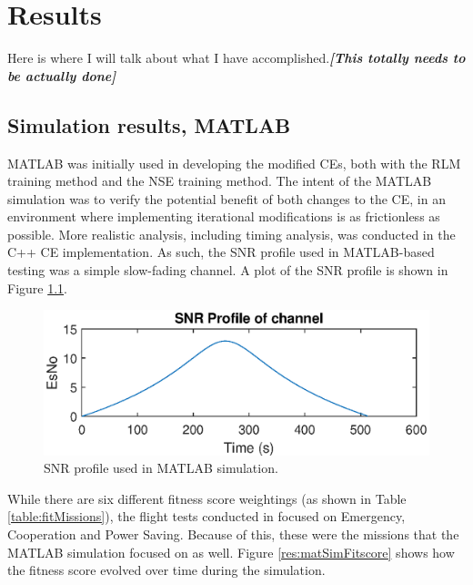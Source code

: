 \chapter{Results}\label{ch:results}

\par Here is where I will talk about what I have accomplished.\textbf{\textit{[This totally needs to be actually done]}}
\section{Simulation results, MATLAB}
\par MATLAB was initially used in developing the modified CEs, both with the RLM training method and the NSE training method. The intent of the MATLAB simulation was to verify the potential benefit of both changes to the CE, in an environment where implementing iterational modifications is as frictionless as possible. More realistic analysis, including timing analysis, was conducted in the C++ CE implementation. As such, the SNR profile used in MATLAB-based testing was a simple slow-fading channel. A plot of the SNR profile is shown in Figure \ref{fig:matlabSNRProf}. 

\begin{figure}[ht]
\centering
\includegraphics[scale=1]{figures/matlab_sim_results/snrPRofile_matlabsim.eps}
\caption{SNR profile used in MATLAB simulation.}
\label{fig:matlabSNRProf}
\end{figure}

\par While there are six different fitness score weightings (as shown in Table \ref{table:fitMissions}), the flight tests conducted in \cite{tim_implementation} focused on Emergency, Cooperation and Power Saving. Because of this, these were the missions that the MATLAB simulation focused on as well. Figure \ref{res:matSimFitscore} shows how the fitness score evolved over time during the simulation.

